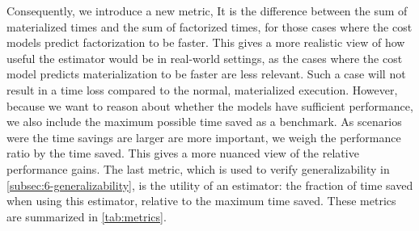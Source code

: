 Consequently, we introduce a new metric, It is the difference between the sum of materialized times and the sum of factorized times, for those cases where the cost models predict factorization to be faster. This gives a more realistic view of how useful the estimator would be in real-world settings, as the cases where the cost model predicts materialization to be faster are less relevant. Such a case will not result in a time loss compared to the normal, materialized execution. However, because we want to reason about whether the models have sufficient performance, we also include the maximum possible time saved as a benchmark. As scenarios were the time savings are larger are more important, we weigh the performance ratio by the time saved. This gives a more nuanced view of the relative performance gains. The last metric, which is used to verify generalizability in \autoref{subsec:6-generalizability}, is the utility of an estimator: the fraction of time saved when using this estimator, relative to the maximum time saved. These metrics are summarized in \autoref{tab:metrics}.

\begin{table}[ht]
    \centering
    \renewcommand{\arraystretch}{1.5} %
    \caption{Metrics to Assess Cost Model Performance}
    \label{tab:metrics}
\end{table}



